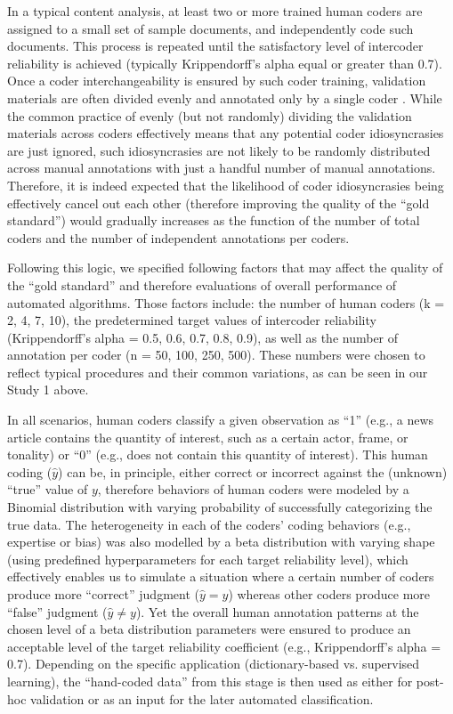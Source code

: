 \documentclass[man, 12pt, a4paper, nolmodern, noextraspace]{apa6}
\begin{document}
    In a typical content analysis, at least two or more trained human coders are assigned to a small set of sample documents, and independently code such documents. This process is repeated until the satisfactory level of intercoder reliability is achieved (typically Krippendorff’s alpha equal or greater than 0.7). Once a coder interchangeability is ensured by such coder training, validation materials are often divided evenly and annotated only by a single coder \parencite{grimmer2018unreliability}. While the common practice of evenly (but not randomly) dividing the validation materials across coders effectively means that any potential coder idiosyncrasies are just ignored, such idiosyncrasies are not likely to be randomly distributed across manual annotations with just a handful number of manual annotations. Therefore, it is indeed expected that the likelihood of coder idiosyncrasies being effectively cancel out each other (therefore improving the quality of the “gold standard”) would gradually increases as the function of the number of total coders and the number of independent annotations per coders.        
    
    Following this logic, we specified following factors that may affect the quality of the “gold standard” and therefore evaluations of overall performance of automated algorithms. Those factors include: the number of human coders (k = 2, 4, 7, 10), the predetermined target values of intercoder reliability (Krippendorff's alpha = 0.5, 0.6, 0.7, 0.8, 0.9), as well as the number of annotation per coder (n = 50, 100, 250, 500). These numbers were chosen to reflect typical procedures and their common variations, as can be seen in our Study 1 above.
    
    In all scenarios, human coders classify a given observation as ``1'' (e.g., a news article contains the quantity of interest, such as a certain actor, frame, or tonality) or ``0'' (e.g., does not contain this quantity of interest). This human coding ($\hat{y}$) can be, in principle, either correct or incorrect against the (unknown) “true” value of $y$, therefore behaviors of human coders were modeled by a Binomial distribution with varying probability of successfully categorizing the true data. The heterogeneity in each of the coders’ coding behaviors (e.g., expertise or bias) was also modelled by a beta distribution with varying shape (using predefined hyperparameters for each target reliability level), which effectively enables us to simulate a situation where a certain number of coders produce more “correct” judgment ($\hat{y} = y$) whereas other coders produce more ``false'' judgment ($\hat{y} \neq y$). Yet the overall human annotation patterns at the chosen level of a beta distribution parameters were ensured to produce an acceptable level of the target reliability coefficient (e.g., Krippendorff's alpha = 0.7). Depending on the specific application (dictionary-based vs. supervised learning), the \enquote{hand-coded data} from this stage is then used as either for post-hoc validation or as an input for the later automated classification. 
    
\end{document}
